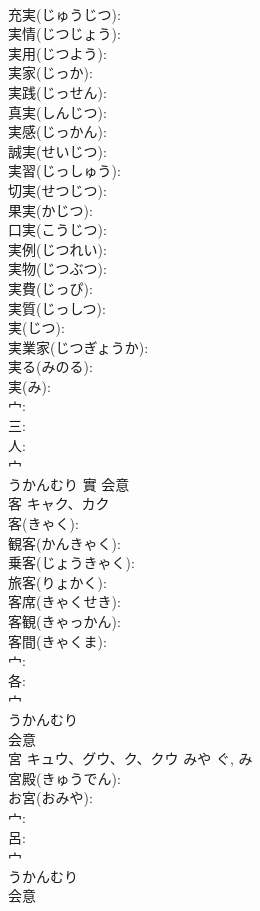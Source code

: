 \documentclass[8pt]{extreport}
\begin{document}
\begin{CJK}{UTF8}{min}
\\	充実(じゅうじつ): 
\\	実情(じつじょう): 
\\	実用(じつよう): 
\\	実家(じっか): 
\\	実践(じっせん): 
\\	真実(しんじつ): 
\\	実感(じっかん): 
\\	誠実(せいじつ): 
\\	実習(じっしゅう): 
\\	切実(せつじつ): 
\\	果実(かじつ): 
\\	口実(こうじつ): 
\\	実例(じつれい): 
\\	実物(じつぶつ): 
\\	実費(じっぴ): 
\\	実質(じっしつ): 
\\	実(じつ): 
\\	実業家(じつぎょうか): 
\\	実る(みのる): 
\\	実(み): 
\\	宀: 
\\	三: 
\\	人: 
\\	宀	
\\	うかんむり	實	会意 
\\	客	キャク、カク			
\\	客(きゃく): 
\\	観客(かんきゃく): 
\\	乗客(じょうきゃく): 
\\	旅客(りょかく): 
\\	客席(きゃくせき): 
\\	客観(きゃっかん): 
\\	客間(きゃくま): 
\\	宀: 
\\	各: 
\\	宀	
\\	うかんむり	
\\	会意 
\\	宮	キュウ、グウ、ク、クウ	みや	ぐ, み	
\\	宮殿(きゅうでん): 
\\	お宮(おみや): 
\\	宀: 
\\	呂: 
\\	宀	
\\	うかんむり	
\\	会意 

\end{CJK}
\end{document}
